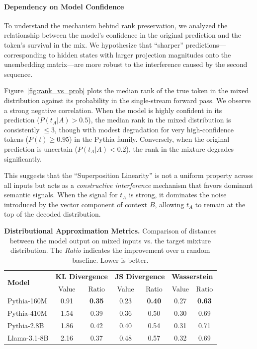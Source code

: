 \documentclass{article}
\theoremstyle{plain}
\theoremstyle{definition}
\theoremstyle{remark}
\begin{document}
\paragraph{Dependency on Model Confidence}
To understand the mechanism behind rank preservation, we analyzed the relationship between the model's confidence in the original prediction and the token's survival in the mix. We hypothesize that ``sharper'' predictions—corresponding to hidden states with larger projection magnitudes onto the unembedding matrix—are more robust to the interference caused by the second sequence.

Figure~\ref{fig:rank_vs_prob} plots the median rank of the true token in the mixed distribution against its probability in the single-stream forward pass. We observe a strong negative correlation. When the model is highly confident in its prediction ($P(t_A|A) > 0.5$), the median rank in the mixed distribution is consistently $\le 3$, though with modest degradation for very high-confidence tokens ($P(t) \geq 0.95$) in the Pythia family. Conversely, when the original prediction is uncertain ($P(t_A|A) < 0.2$), the rank in the mixture degrades significantly.

This suggests that the ``Superposition Linearity'' is not a uniform property across all inputs but acts as a \textit{constructive interference} mechanism that favors dominant semantic signals. When the signal for $t_A$ is strong, it dominates the noise introduced by the vector component of context $B$, allowing $t_A$ to remain at the top of the decoded distribution.

\begin{table}[h]
    \tiny
    \centering
    \caption{\textbf{Distributional Approximation Metrics.} Comparison of distances between the model output on mixed inputs vs. the target mixture distribution. The \textit{Ratio} indicates the improvement over a random baseline. Lower is better.}
    \label{tab:dist_metrics}
    \begin{tabular}{l|cc|cc|cc}
        \toprule
        \multirow{2}{*}{\textbf{Model}} & \multicolumn{2}{c|}{\textbf{KL Divergence}} & \multicolumn{2}{c|}{\textbf{JS Divergence}} & \multicolumn{2}{c}{\textbf{Wasserstein}} \\
         & Value & Ratio & Value & Ratio & Value & Ratio \\
        \midrule
        Pythia-160M & 0.91 & \textbf{0.35} & 0.23 & \textbf{0.40} & 0.27 & \textbf{0.63} \\
        Pythia-410M & 1.54 & 0.39 & 0.36 & 0.50 & 0.30 & 0.69 \\
        Pythia-2.8B & 1.86 & 0.42 & 0.40 & 0.54 & 0.31 & 0.71 \\
        Llama-3.1-8B  & 2.16 & 0.37 & 0.48 & 0.57 & 0.32 & 0.69 \\
        \bottomrule
    \end{tabular}
\end{table}
\end{document}
